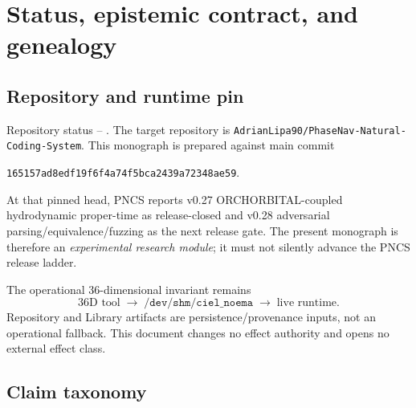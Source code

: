 \section{Status, epistemic contract, and genealogy}

\subsection{Repository and runtime pin}

\begin{claim}{Repository status -- .}
The target repository is \texttt{AdrianLipa90/PhaseNav-Natural-Coding-System}. This monograph is prepared against main commit
\begin{center}
\texttt{165157ad8edf19f6f4a74f5bca2439a72348ae59}.
\end{center}
At that pinned head, PNCS reports v0.27 ORCHORBITAL-coupled hydrodynamic proper-time as release-closed and v0.28 adversarial parsing/equivalence/fuzzing as the next release gate. The present monograph is therefore an \emph{experimental research module}; it must not silently advance the PNCS release ladder.
\end{claim}

The operational 36-dimensional invariant remains
\begin{equation}
\boxed{\text{36D tool}\;\longrightarrow\;/\texttt{dev/shm/ciel\_noema}\;\longrightarrow\;\text{live runtime}.}
\end{equation}
Repository and Library artifacts are persistence/provenance inputs, not an operational fallback. This document changes no effect authority and opens no external effect class.

\subsection{Claim taxonomy}

